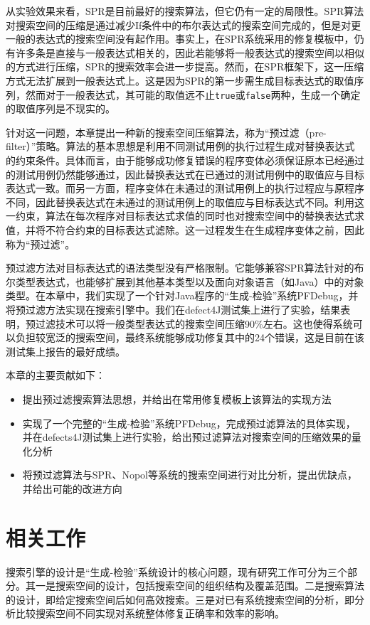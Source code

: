 从实验效果来看，SPR是目前最好的搜索算法，但它仍有一定的局限性。SPR算法对搜索空间的压缩是通过减少If条件中的布尔表达式的搜索空间完成的，但是对更一般的表达式的搜索空间没有起作用。事实上，在SPR系统采用的修复模板中，仍有许多条是直接与一般表达式相关的，因此若能够将一般表达式的搜索空间以相似的方式进行压缩，SPR的搜索效率会进一步提高。然而，在SPR框架下，这一压缩方式无法扩展到一般表达式上。这是因为SPR的第一步需生成目标表达式的取值序列，然而对于一般表达式，其可能的取值远不止\texttt{true}或\texttt{false}两种，生成一个确定的取值序列是不现实的。

针对这一问题，本章提出一种新的搜索空间压缩算法，称为“预过滤（pre-filter）”策略。算法的基本思想是利用不同测试用例的执行过程生成对替换表达式的约束条件。具体而言，由于能够成功修复错误的程序变体必须保证原本已经通过的测试用例仍然能够通过，因此替换表达式在已通过的测试用例中的取值应与目标表达式一致。而另一方面，程序变体在未通过的测试用例上的执行过程应与原程序不同，因此替换表达式在未通过的测试用例上的取值应与目标表达式不同。利用这一约束，算法在每次程序对目标表达式求值的同时也对搜索空间中的替换表达式求值，并将不符合约束的目标表达式滤除。这一过程发生在生成程序变体之前，因此称为“预过滤”。

预过滤方法对目标表达式的语法类型没有严格限制。它能够兼容SPR算法针对的布尔类型表达式，也能够扩展到其他基本类型以及面向对象语言（如Java）中的对象类型。在本章中，我们实现了一个针对Java程序的“生成-检验”系统PFDebug，并将预过滤方法实现在搜索引擎中。我们在defect4J测试集上进行了实验，结果表明，预过滤技术可以将一般类型表达式的搜索空间压缩90\%左右。这也使得系统可以负担较宽泛的搜索空间，最终系统能够成功修复其中的24个错误，这是目前在该测试集上报告的最好成绩。

本章的主要贡献如下：
\begin{itemize}
	\item 提出预过滤搜索算法思想，并给出在常用修复模板上该算法的实现方法
	\item 实现了一个完整的“生成-检验”系统PFDebug，完成预过滤算法的具体实现，并在defects4J测试集上进行实验，给出预过滤算法对搜索空间的压缩效果的量化分析
	\item 将预过滤算法与SPR、Nopol等系统的搜索空间进行对比分析，提出优缺点，并给出可能的改进方向
\end{itemize}

\section{相关工作}%

搜索引擎的设计是“生成-检验”系统设计的核心问题，现有研究工作可分为三个部分。其一是搜索空间的设计，包括搜索空间的组织结构及覆盖范围。二是搜索算法的设计，即给定搜索空间后如何高效搜索。三是对已有系统搜索空间的分析，即分析比较搜索空间不同实现对系统整体修复正确率和效率的影响。

